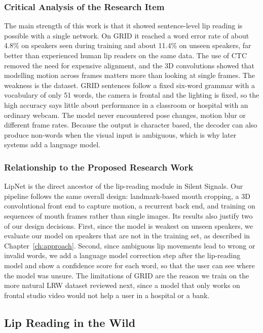 \documentclass{FastFyp}
\begin{document}
\subsubsection*{Critical Analysis of the Research Item}
The main strength of this work is that it showed sentence-level lip reading is possible with a single network. On GRID it reached a word error rate of about 4.8\% on speakers seen during training and about 11.4\% on unseen speakers, far better than experienced human lip readers on the same data. The use of CTC removed the need for expensive alignment, and the 3D convolutions showed that modelling motion across frames matters more than looking at single frames. The weakness is the dataset. GRID sentences follow a fixed six-word grammar with a vocabulary of only 51 words, the camera is frontal and the lighting is fixed, so the high accuracy says little about performance in a classroom or hospital with an ordinary webcam. The model never encountered pose changes, motion blur or different frame rates. Because the output is character based, the decoder can also produce non-words when the visual input is ambiguous, which is why later systems add a language model.

\subsubsection*{Relationship to the Proposed Research Work}
LipNet is the direct ancestor of the lip-reading module in Silent Signals. Our pipeline follows the same overall design: landmark-based mouth cropping, a 3D convolutional front end to capture motion, a recurrent back end, and training on sequences of mouth frames rather than single images. Its results also justify two of our design decisions. First, since the model is weakest on unseen speakers, we evaluate our model on speakers that are not in the training set, as described in Chapter~\ref{ch:approach}. Second, since ambiguous lip movements lead to wrong or invalid words, we add a language model correction step after the lip-reading model and show a confidence score for each word, so that the user can see where the model was unsure. The limitations of GRID are the reason we train on the more natural LRW dataset reviewed next, since a model that only works on frontal studio video would not help a user in a hospital or a bank.

\subsection{Lip Reading in the Wild}
\end{document}
